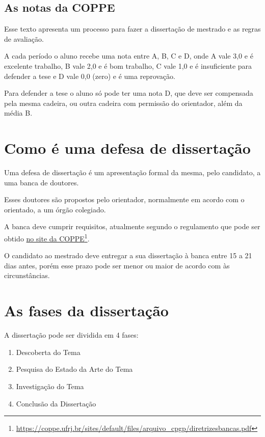 \documentclass{book}
\begin{document}
\section{As notas da COPPE}

Esse texto apresenta um processo para fazer a dissertação de mestrado e as regras de avaliação.

A cada período o aluno recebe uma nota entre A, B, C e D, onde A vale 3,0 e é excelente trabalho, B vale 2,0 e é bom trabalho, C vale 1,0 e é insuficiente para defender a tese e D vale 0,0 (zero) e é uma reprovação.

Para defender a tese o aluno só pode ter uma nota D, que deve ser compensada pela mesma cadeira, ou outra cadeira com permissão do orientador, além da média B.



\chapter{Como é uma defesa de dissertação}

Uma defesa de dissertação é um apresentação formal da mesma, pelo candidato, a uma banca de doutores.

Esses doutores são propostos pelo orientador, normalmente em acordo com o orientado, a um órgão colegiado.

A banca deve cumprir requisitos, atualmente segundo o regulamento que pode ser obtido  \href{https://coppe.ufrj.br/pt-br/node/3464}{no site da COPPE}\footnote{\url{https://coppe.ufrj.br/sites/default/files/arquivo_cpgp/diretrizesbancas.pdf}}.

O candidato ao mestrado deve entregar a sua dissertação à banca entre 15 a 21 dias antes, porém esse prazo pode ser menor ou maior de acordo com às circunstâncias. 

\chapter{As fases da dissertação}

A dissertação pode ser dividida em 4 fases:
\begin{enumerate}
    \item Descoberta do Tema
    \item Pesquisa do Estado da Arte do Tema
    \item Investigação do Tema
    \item Conclusão da Dissertação
\end{enumerate}
\end{document}
